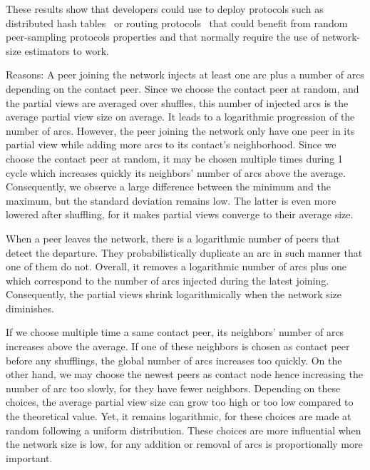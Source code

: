 \begin{asparadesc}
  These results show that developers could use \SPRAY to deploy protocols such
  as distributed hash tables~\cite{camarillo2014self} or routing
  protocols~\cite{kleinberg2000smallworld} that could benefit from random
  peer-sampling protocols properties and that normally require the use of
  network-size estimators to work.


\item [Reasons:] A peer joining the network injects at least one arc plus a
  number of arcs depending on the contact peer. Since we choose the contact peer
  at random, and the partial views are averaged over shuffles, this number of
  injected arcs is the average partial view size on average. It leads to a
  logarithmic progression of the number of arcs. However, the peer joining the
  network only have one peer in its partial view while adding more arcs to its
  contact's neighborhood. Since we choose the contact peer at random, it may be
  chosen multiple times during 1 cycle which increases quickly its neighbors'
  number of arcs above the average. Consequently, we observe a large difference
  between the minimum and the maximum, but the standard deviation remains
  low. The latter is even more lowered after shuffling, for it makes partial
  views converge to their average size. 

  When a peer leaves the network, there is a logarithmic number of peers that
  detect the departure. They probabilistically duplicate an arc in such manner
  that one of them do not. Overall, it removes a logarithmic number of arcs plus
  one which correspond to the number of arcs injected during the latest
  joining. Consequently, the partial views shrink logarithmically when the
  network size diminishes.

  If we choose multiple time a same contact peer, its neighbors' number of arcs
  increases above the average. If one of these neighbors is chosen as contact
  peer before any shufflings, the global number of arcs increases too
  quickly. On the other hand, we may choose the newest peers as contact node
  hence increasing the number of arc too slowly, for they have fewer
  neighbors. Depending on these choices, the average partial view size can grow
  too high or too low compared to the theoretical value. Yet, it remains
  logarithmic, for these choices are made at random following a uniform
  distribution. These choices are more influential when the network size is low,
  for any addition or removal of arcs is proportionally more important.
\end{asparadesc}

